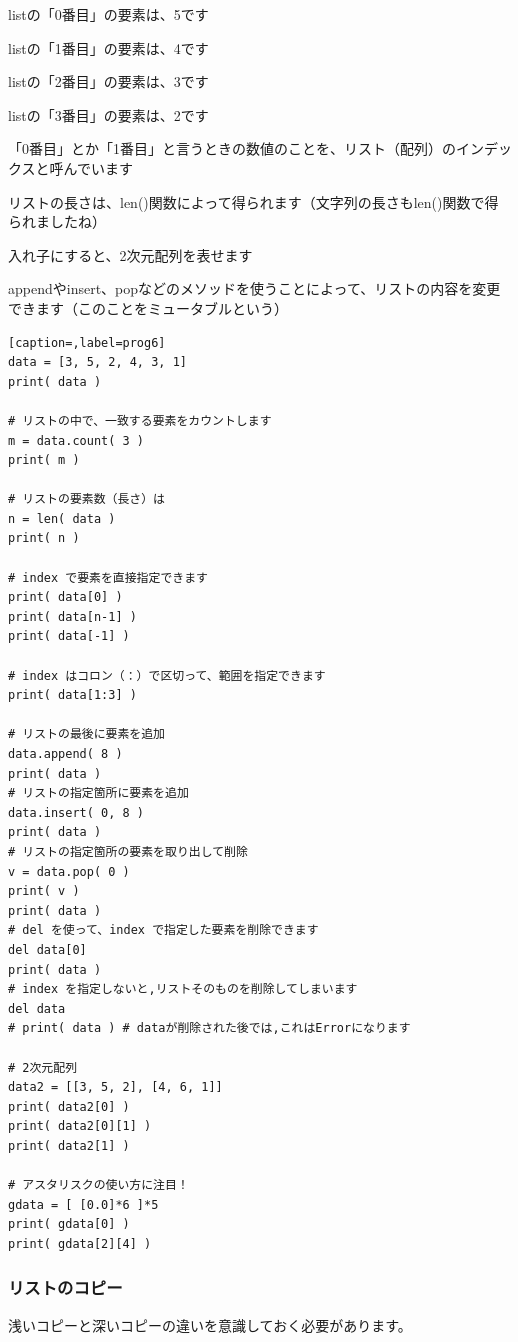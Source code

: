 \documentclass[uplatex,a4paper,11pt,oneside,openany]{jsbook}
\begin{document}
listの「0番目」の要素は、5です

listの「1番目」の要素は、4です

listの「2番目」の要素は、3です

listの「3番目」の要素は、2です

「0番目」とか「1番目」と言うときの数値のことを、リスト（配列）のインデックスと呼んでいます

リストの長さは、len()関数によって得られます（文字列の長さもlen()関数で得られましたね）

入れ子にすると、2次元配列を表せます

appendやinsert、popなどのメソッドを使うことによって、リストの内容を変更できます（このことをミュータブルという）

\begin{lstlisting}[caption=,label=prog6]
data = [3, 5, 2, 4, 3, 1]
print( data )

# リストの中で、一致する要素をカウントします
m = data.count( 3 )
print( m )

# リストの要素数（長さ）は
n = len( data )
print( n )

# index で要素を直接指定できます
print( data[0] )
print( data[n-1] )
print( data[-1] )

# index はコロン（：）で区切って、範囲を指定できます
print( data[1:3] )

# リストの最後に要素を追加
data.append( 8 )
print( data )
# リストの指定箇所に要素を追加
data.insert( 0, 8 )
print( data )
# リストの指定箇所の要素を取り出して削除
v = data.pop( 0 )
print( v )
print( data )
# del を使って、index で指定した要素を削除できます
del data[0]
print( data )
# index を指定しないと,リストそのものを削除してしまいます
del data
# print( data ) # dataが削除された後では,これはErrorになります

# 2次元配列
data2 = [[3, 5, 2], [4, 6, 1]]
print( data2[0] )
print( data2[0][1] )
print( data2[1] )

# アスタリスクの使い方に注目！
gdata = [ [0.0]*6 ]*5
print( gdata[0] )
print( gdata[2][4] )
\end{lstlisting}

\subsubsection{リストのコピー}

浅いコピーと深いコピーの違いを意識しておく必要があります。
\end{document}
